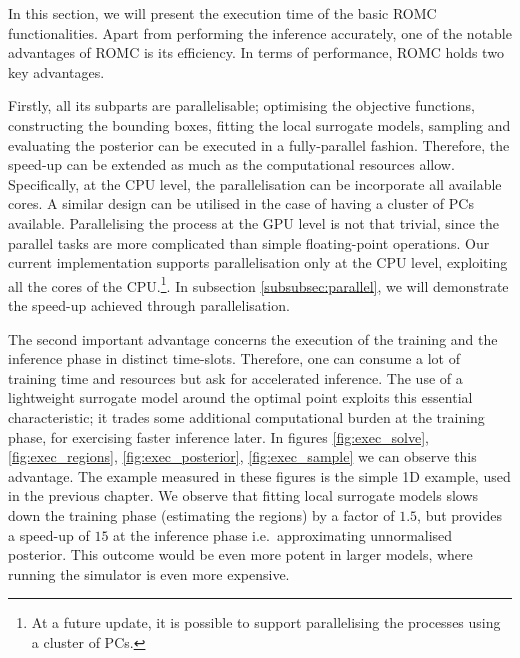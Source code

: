 In this section, we will present the execution time of the basic ROMC
functionalities. Apart from performing the inference accurately, one
of the notable advantages of ROMC is its efficiency. In terms of
performance, ROMC holds two key advantages.

Firstly, all its subparts are parallelisable; optimising the objective
functions, constructing the bounding boxes, fitting the local
surrogate models, sampling and evaluating the posterior can be
executed in a fully-parallel fashion. Therefore, the speed-up can be
extended as much as the computational resources allow. Specifically,
at the CPU level, the parallelisation can be incorporate all available
cores. A similar design can be utilised in the case of having a
cluster of PCs available. Parallelising the process at the GPU level
is not that trivial, since the parallel tasks are more complicated
than simple floating-point operations. Our current implementation
supports parallelisation only at the CPU level, exploiting all the cores of the CPU.\footnote{At a future update, it is possible to support parallelising the processes using a cluster of PCs.}. In subsection
\ref{subsubsec:parallel}, we will demonstrate the speed-up achieved
through parallelisation.

The second important advantage concerns the execution of the
training and the inference phase in distinct time-slots. Therefore, one
can consume a lot of training time and resources but ask for
accelerated inference. The use of a lightweight surrogate model around
the optimal point exploits this essential characteristic; it trades
some additional computational burden at the training phase, for
exercising faster inference later. In figures \ref{fig:exec_solve},
\ref{fig:exec_regions}, \ref{fig:exec_posterior},
\ref{fig:exec_sample} we can observe this advantage. The
example measured in these figures is the simple 1D example, used in
the previous chapter. We observe that fitting local surrogate models
slows down the training phase (estimating the regions) by a factor of
$1.5$, but provides a speed-up of $15$ at the inference phase i.e.\
approximating unnormalised posterior. This outcome would be even more
potent in larger models, where running the simulator is even more
expensive.



